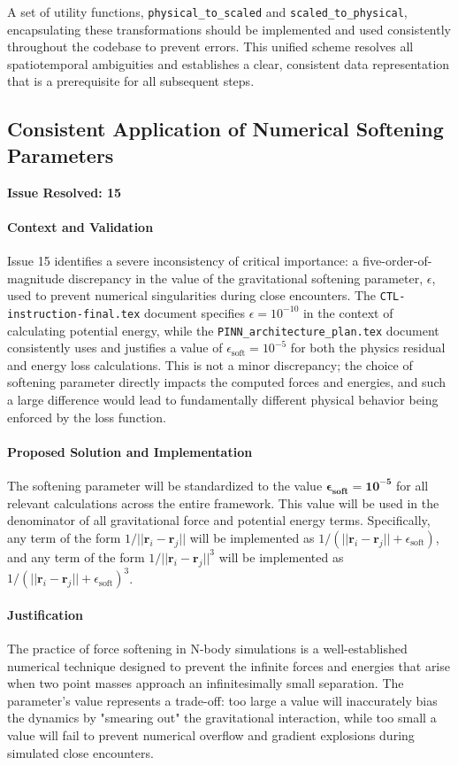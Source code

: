 \documentclass[11pt, a4paper]{article}
\begin{document}
A set of utility functions, \texttt{physical\_to\_scaled} and \texttt{scaled\_to\_physical}, encapsulating these transformations should be implemented and used consistently throughout the codebase to prevent errors. This unified scheme resolves all spatiotemporal ambiguities and establishes a clear, consistent data representation that is a prerequisite for all subsequent steps.

\subsection{Consistent Application of Numerical Softening Parameters}
\textbf{Issue Resolved: 15}
\paragraph{Context and Validation}
Issue 15 identifies a severe inconsistency of critical importance: a five-order-of-magnitude discrepancy in the value of the gravitational softening parameter, $\epsilon$, used to prevent numerical singularities during close encounters. The \texttt{CTL-instruction-final.tex} document specifies $\epsilon = 10^{-10}$ in the context of calculating potential energy, while the \texttt{PINN\_\allowbreak architecture\_\allowbreak plan.tex} document consistently uses and justifies a value of $\epsilon_{\text{soft}} = 10^{-5}$ for both the physics residual and energy loss calculations. This is not a minor discrepancy; the choice of softening parameter directly impacts the computed forces and energies, and such a large difference would lead to fundamentally different physical behavior being enforced by the loss function.

\paragraph{Proposed Solution and Implementation}
The softening parameter will be standardized to the value $\boldsymbol{\epsilon_{\text{soft}} = 10^{-5}}$ for all relevant calculations across the entire framework. This value will be used in the denominator of all gravitational force and potential energy terms. Specifically, any term of the form $1/||\mathbf{r}_i - \mathbf{r}_j||$ will be implemented as $1/(||\mathbf{r}_i - \mathbf{r}_j|| + \epsilon_{\text{soft}})$, and any term of the form $1/||\mathbf{r}_i - \mathbf{r}_j||^3$ will be implemented as $1/(||\mathbf{r}_i - \mathbf{r}_j|| + \epsilon_{\text{soft}})^3$.

\paragraph{Justification}
The practice of force softening in N-body simulations is a well-established numerical technique designed to prevent the infinite forces and energies that arise when two point masses approach an infinitesimally small separation. The parameter's value represents a trade-off: too large a value will inaccurately bias the dynamics by "smearing out" the gravitational interaction, while too small a value will fail to prevent numerical overflow and gradient explosions during simulated close encounters.
\end{document}
